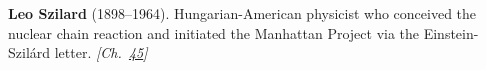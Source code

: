 \textbf{Leo Szilard} (1898–1964). Hungarian-American physicist who conceived the nuclear chain reaction and initiated the Manhattan Project via the Einstein-Szil\'{a}rd letter. \emph{[Ch.~\hyperref[ch:maxwelldemon]{45}]}


